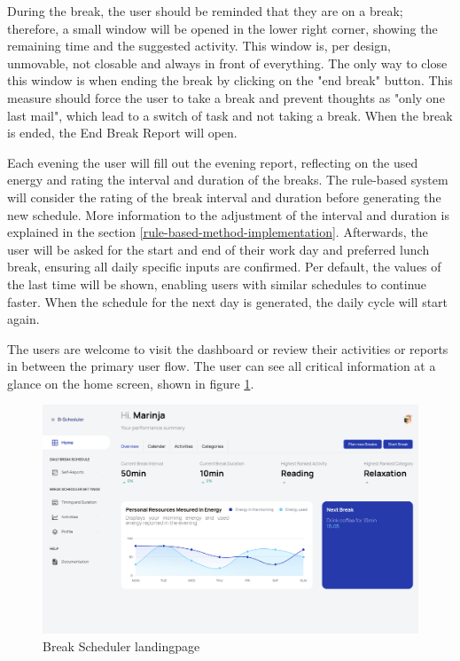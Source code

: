 \documentclass{hasel_thesis}
\begin{document}
During the break, the user should be reminded that they are on a break; therefore, a small window will be opened in the lower right corner, showing the remaining time and the suggested activity. This window is, per design, unmovable, not closable and always in front of everything. The only way to close this window is when ending the break by clicking on the "end break" button. This measure should force the user to take a break and prevent thoughts as "only one last mail", which lead to a switch of task and not taking a break. When the break is ended, the End Break Report will open.


Each evening the user will fill out the evening report, reflecting on the used energy and rating the interval and duration of the breaks. The rule-based system will consider the rating of the break interval and duration before generating the new schedule. More information to the adjustment of the interval and duration is explained in the section \ref{rule-based-method-implementation}. Afterwards, the user will be asked for the start and end of their work day and preferred lunch break, ensuring all daily specific inputs are confirmed. Per default, the values of the last time will be shown, enabling users with similar schedules to continue faster. When the schedule for the next day is generated, the daily cycle will start again.

The users are welcome to visit the dashboard or review their activities or reports in between the primary user flow. The user can see all critical information at a glance on the home screen, shown in figure \ref{fig:dashboard}.

\begin{figure}[htp]
    \centering
    \includegraphics[width=15cm]{hasel_thesis/images/dashboard.png}
    \caption{Break Scheduler landingpage}
    \label{fig:dashboard}
\end{figure}
\end{document}
